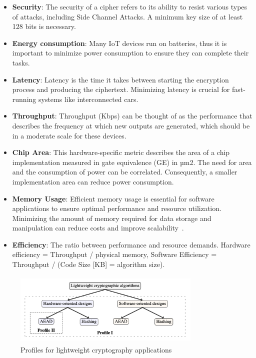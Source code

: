 \begin{itemize}
    \setlength{\itemsep}{-5pt}
    \item \textbf{Security}: The security of a cipher refers to its ability to resist various types of attacks, including Side Channel Attacks. A minimum key size of at least 128 bits is necessary.
    \item \textbf{Energy consumption}: Many IoT devices run on batteries, thus it is important to minimize power consumption to ensure they can complete their tasks.
    \item \textbf{Latency}: Latency is the time it takes between starting the encryption process and producing the ciphertext. Minimizing latency is crucial for fast-running systems like interconnected cars.
    \item \textbf{Throughput}: Throughput (Kbps) can be thought of as the performance that describes the frequency at which new outputs are generated, which should be in a moderate scale for these devices.
    \item \textbf{Chip Area}: This hardware-specific metric describes the area of a chip implementation measured in gate equivalence (GE) in µm2. The need for area and the consumption of power can be correlated. Consequently, a smaller implementation area can reduce power consumption.
    \item \textbf{Memory Usage}: Efficient memory usage is essential for software applications to ensure optimal performance and resource utilization. Minimizing the amount of memory required for data storage and manipulation can reduce costs and improve scalability~\cite{mckay2016report}.
    \item \textbf{Efficiency}: The ratio between performance and resource demands. Hardware efficiency = Throughput / physical memory, Software Efficiency = Throughput / (Code Size [KB] = algorithm size).
\end{itemize}

\begin{figure}[h]
    \centering
    \includegraphics[width=9.0cm, height=3.5cm]{media/profiles.png}
    \caption{Profiles for lightweight cryptography applications}\label{fig:profiles}
\end{figure}

